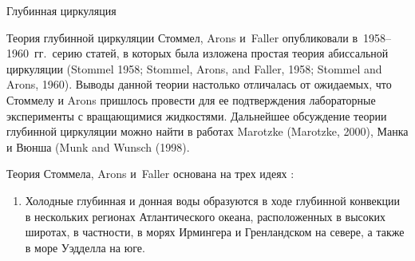 \begin{chapter}{Глубинная циркуляция}
\begin{section}{Теория глубинной циркуляции}
%
%
Стоммел, Arons и~Faller опубликовали в~1958--1960~гг.\ серию статей, в которых
была изложена простая теория абиссальной циркуляции%
%
(Stommel 1958; Stommel, Arons, and Faller, 1958; Stommel and Arons, 1960). 
Выводы данной теории настолько отличалась от ожидаемых, что Стоммелу 
и Arons пришлось провести для ее подтверждения лабораторные эксперименты
с вращающимися жидкостями. Дальнейшее обсуждение теории глубинной циркуляции
можно найти в работах Marotzke (Marotzke, 2000), 
Манка и Вюнша (Munk and Wunsch (1998).
%

Теория Стоммела, Arons и~Faller
основана на трех идеях%
%
:
%
%
\begin{enumerate}
\item
Холодные глубинная и донная воды образуются в ходе глубинной конвекции в нескольких
регионах Атлантического океана, расположенных в высоких широтах, в частности,
в морях Ирмингера и Гренландском на севере, а также в море Уэдделла на юге. 
%


\end{enumerate}
\end{section}
\end{chapter}
